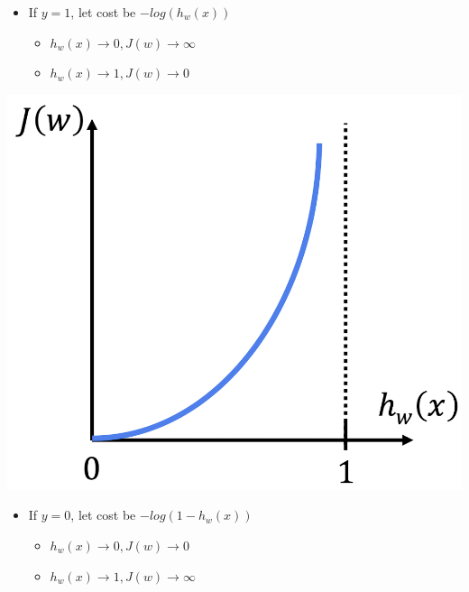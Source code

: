 \documentclass{article}
\begin{document}
\begin{multicols*}{3}
\begin{multicols*}{2}
    \begin{itemize}
        \item If $y = 1$, let cost be $-log(h_w (x))$
        \begin{itemize}
            \item $h_w (x) \rightarrow 0, J(w) \rightarrow \infty$
            \item $h_w (x) \rightarrow 1, J(w) \rightarrow 0$
        \end{itemize}
    \end{itemize}

\end{multicols*}

\begin{multicols*}{2}

    \includegraphics[scale=0.13]{logistic-regression-cost-2}

    \begin{itemize}
        \item If $y = 0$, let cost be $-log(1 - h_w (x))$
        \begin{itemize}
            \item $h_w (x) \rightarrow 0, J(w) \rightarrow 0$
            \item $h_w (x) \rightarrow 1, J(w) \rightarrow \infty$
        \end{itemize}
    \end{itemize}

\end{multicols*}


\end{multicols*}
\end{document}
